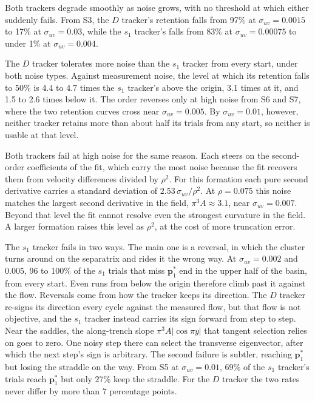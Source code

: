 \documentclass[lettersize,journal]{IEEEtran}
\begin{document}
Both trackers degrade smoothly as noise grows, with no threshold at which
either suddenly fails. From S3, the $D$ tracker's retention
falls from 97\% at $\sigma_{uv} = 0.0015$ to 17\% at $\sigma_{uv} = 0.03$,
while the $s_1$ tracker's falls from 83\% at $\sigma_{uv} = 0.00075$ to
under 1\% at $\sigma_{uv} = 0.004$.

The $D$ tracker tolerates more noise than the $s_1$ tracker from every
start, under both noise types. Against measurement noise, the level at
which its retention falls to 50\% is 4.4 to 4.7 times the $s_1$ tracker's
above the origin, 3.1 times at it, and 1.5 to 2.6 times below it. The
order reverses only at high noise from S6 and S7, where the two retention
curves cross near $\sigma_{uv} = 0.005$. By $\sigma_{uv} = 0.01$, however,
neither tracker retains more than about half its trials from any start, so
neither is usable at that level.

Both trackers fail at high noise for the same reason. Each steers on the
second-order coefficients of the fit, which carry the most noise because
the fit recovers them from velocity differences divided by $\rho^2$. For
this formation each pure second derivative carries a standard deviation of
$2.53\,\sigma_{uv}/\rho^2$. At $\rho = 0.075$ this noise matches the
largest second derivative in the field, $\pi^3 A \approx 3.1$, near
$\sigma_{uv} = 0.007$. Beyond that level the fit cannot resolve even the
strongest curvature in the field. A larger formation raises this level as
$\rho^2$, at the cost of more truncation error.

The $s_1$ tracker fails in two ways. The main one is a reversal, in which
the cluster turns around on the separatrix and rides it the wrong way. At
$\sigma_{uv} = 0.002$ and $0.005$, 96 to 100\% of the $s_1$ trials that
miss $\mathbf{p}^*_1$ end in the upper half of the basin, from every start.
Even runs from below the origin therefore climb past it against the flow.
Reversals come from how the tracker keeps its direction. The $D$ tracker
re-signs its direction every cycle against the measured flow, but that flow
is not objective, and the $s_1$ tracker instead carries its sign forward
from step to step. Near the saddles, the along-trench slope
$\pi^3 A|\cos\pi y|$ that tangent selection relies on goes to zero. One
noisy step there can select the transverse eigenvector, after which the
next step's sign is arbitrary. The second failure is subtler, reaching
$\mathbf{p}^*_1$ but losing the straddle on the way. From S5 at
$\sigma_{uv} = 0.01$, 69\% of the $s_1$ tracker's trials reach
$\mathbf{p}^*_1$ but only 27\% keep the straddle. For the $D$ tracker the
two rates never differ by more than 7 percentage points.
\end{document}
